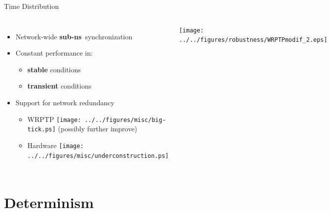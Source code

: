 \documentclass[compress,red]{beamer}
\begin{document}
\begin{frame}{Time Distribution}

  \begin{columns}[c]

  \begin{itemize}
    \item Network-wide {\bf sub-ns}~synchronization
    \vspace{0.3cm}
    \item Constant performance in:
	\begin{itemize}
	  \item {\bf stable} conditions
	  \item {\bf transient} conditions
	\end{itemize}
    \vspace{0.3cm}
    \item Support for network redundancy
    \begin{itemize}
      \item WRPTP \texttt{[image: ../../figures/misc/big-tick.ps]}  (possibly further improve)
      \item Hardware \texttt{[image: ../../figures/misc/underconstruction.ps]}
    \end{itemize}
  \end{itemize}


      \begin{center}
	\texttt{[image: ../../figures/robustness/WRPTPmodif\_2.eps]}
      \end{center}  
    

  \end{columns}

\end{frame}
\section{Determinism}
\end{document}
